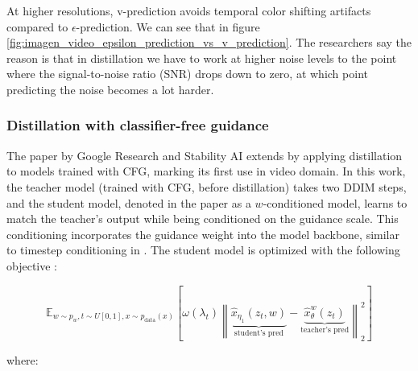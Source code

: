 At higher resolutions, v-prediction avoids temporal color shifting artifacts compared to $\epsilon$-prediction. We can see that in figure \ref{fig:imagen_video_epsilon_prediction_vs_v_prediction}. The researchers say the reason is that in distillation we have to work at higher noise levels to the point where the signal-to-noise ratio (SNR) drops down to zero, at which point predicting the noise becomes a lot harder.













\subsubsection*{Distillation with classifier-free guidance}

The paper \cite{meng2023distillation} by Google Research and Stability AI extends \cite{v_prediction} by applying distillation to models trained with CFG, marking its first use in video domain. In this work, the teacher model (trained with CFG, before distillation) takes two DDIM steps, and the student model, denoted in the paper as a $w$-conditioned model, learns to match the teacher's output while being conditioned on the guidance scale. This conditioning incorporates the guidance weight into the model backbone, similar to timestep conditioning in \cite{kingma2021variational}. The student model is optimized with the following objective \cite{meng2023distillation}:

\begin{equation*}
\mathbb{E}_{w \sim p_w, t \sim U[0, 1], x \sim p_{\text{data}}(x)} 
\left[ 
    \omega(\lambda_t) \left\| 
        \underbrace{\hat{x}_{\eta_1}(z_t, w)}_{\text{student's pred}} - 
        \underbrace{\hat{x}_{\theta}^w(z_t) }_{\text{teacher's pred}}
    \right\|_2^2 
\right]
\end{equation*}

where:

